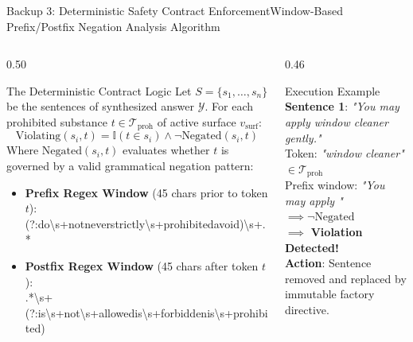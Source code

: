 \documentclass[aspectratio=169,10pt]{beamer}
\begin{document}
\begin{frame}{Backup 3: Deterministic Safety Contract Enforcement}{Window-Based Prefix/Postfix Negation Analysis Algorithm}
  \begin{columns}[T]
    \begin{column}{0.50\textwidth}
      \begin{block}{The Deterministic Contract Logic}
        \scriptsize
        Let $S = \{s_1, \dots, s_n\}$ be the sentences of synthesized answer $\mathcal{Y}$.
        For each prohibited substance $t \in \mathcal{T}_{\text{proh}}$ of active surface $v_{\text{surf}}$:
        \begin{equation*}
          \text{Violating}(s_i, t) = \mathbb{I}(t \in s_i) \land \neg \text{Negated}(s_i, t)
        \end{equation*}
        Where $\text{Negated}(s_i, t)$ evaluates whether $t$ is governed by a valid grammatical negation pattern:
        \begin{itemize}\setlength\itemsep{0.2ex}
          \item \textbf{Prefix Regex Window} (45 chars prior to token $t$):\\
            {\ttfamily\tiny (?:do\textbackslash{}s+not\textbar{}never\textbar{}strictly\textbackslash{}s+prohibited\textbar{}avoid)\textbackslash{}s+.*}
          \item \textbf{Postfix Regex Window} (45 chars after token $t$):\\
            {\ttfamily\tiny .*\textbackslash{}s+(?:is\textbackslash{}s+not\textbackslash{}s+allowed\textbar{}is\textbackslash{}s+forbidden\textbar{}is\textbackslash{}s+prohibited)}
        \end{itemize}
      \end{block}
    \end{column}

    \begin{column}{0.46\textwidth}
      \begin{alertblock}{Execution Example}
        \scriptsize
        \textbf{Sentence 1}: \textit{"You may apply window cleaner gently."}\\
        Token: \textit{"window cleaner"} $\in \mathcal{T}_{\text{proh}}$\\
        Prefix window: \textit{"You may apply "} $\implies \neg\text{Negated}$\\
        $\implies$ \textbf{Violation Detected!}\\
        \textbf{Action}: Sentence removed and replaced by immutable factory directive.
      \end{alertblock}


\end{column}
\end{columns}
\end{frame}
\end{document}
